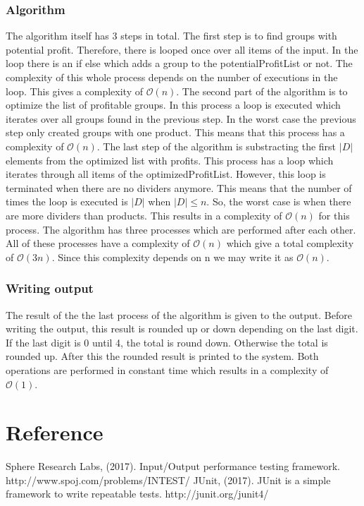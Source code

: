 \documentclass{article}
\newcommand{\bigO}[1]{\mathcal{O}(#1)}
\begin{document}
\subsubsection{Algorithm}
The algorithm itself has 3 steps in total. The first step is to find groups with potential profit. Therefore, there is looped once over all items of the input. In the loop there is an if else which adds a group to the potentialProfitList or not. The complexity of this whole process depends on the number of executions in the loop. This gives a complexity of $\bigO{n}$.
\newline
\newline
The second part of the algorithm is to optimize the list of profitable groups. In this process a loop is executed which iterates over all groups found in the previous step. In the worst case the previous step only created groups with one product. This means that this process has a complexity of $\bigO{n}$.
\newline
\newline
The last step of the algorithm is substracting the first $|D|$ elements from the optimized list with profits. This process has a loop which iterates through all items of the optimizedProfitList. However, this loop is terminated when there are no dividers anymore. This means that the number of times the loop is executed is $|D|$ when $|D| \leq n$. So, the worst case is when there are more dividers than products. This results in a complexity of $\bigO{n}$ for this process.
\newline
\newline
The algorithm has three processes which are performed after each other. All of these processes have a complexity of $\bigO{n}$ which give a total complexity of $\bigO{3n}$. Since this complexity depends on n we may write it as $\bigO{n}$.

\subsubsection{Writing output}
The result of the the last process of the algorithm is given to the output. Before writing the output, this result is rounded up or down depending on the last digit. If the last digit is 0 until 4, the total is round down. Otherwise the total is rounded up. After this the rounded result is printed to the system. Both operations are performed in constant time which results in a complexity of $\bigO{1}$.

\newpage
\section{Reference}
Sphere Research Labs, (2017). Input/Output performance testing framework. \newline
http://www.spoj.com/problems/INTEST/
\newline
\newline
JUnit, (2017). JUnit is a simple framework to write repeatable tests. \newline
http://junit.org/junit4/
\end{document}
